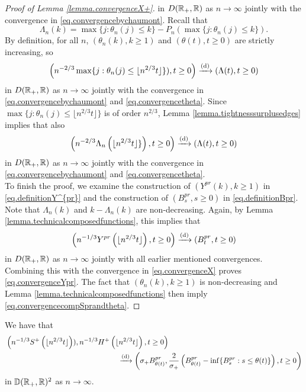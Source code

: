 \begin{proof}[Proof of Lemma \ref{lemma.convergenceX+}]
  in $D({\mathbb R}_+,{\mathbb R})$ as $n\to \infty$ jointly with the convergence in \eqref{eq.convergencebychaumont}.
Recall that 
$$\Lambda_n(k)=\max\{j:\theta_n(j)\leq k\}-P_n(\max\{j:\theta_n(j)\leq k\}). $$ By definition, for all $n$, $(\theta_n(k),k\geq 1)$ and $(\theta(t),t\geq 0)$ are strictly increasing, so
$$\left(n^{-2/3}\max\{j:\theta_n(j)\leq \lfloor n^{2/3} t \rfloor\} ),t\geq 0\right)\xrightarrow[]{\mathrm{(d)}}\left( \Lambda(t),t\geq0 \right)$$
in $D({\mathbb R}_+,{\mathbb R})$ as $n\to \infty$ jointly with the convergence in \eqref{eq.convergencebychaumont} and \eqref{eq.convergencetheta}. Since $\max\{j:\theta_n(j)\leq \lfloor n^{2/3} t \rfloor\}$ is of order $n^{2/3}$, Lemma \ref{lemma.tightnesssurplusedges} implies that also 
$$\left(n^{-2/3}\Lambda_n\left(\lfloor n^{2/3} t \rfloor\} \right),t\geq 0\right)\xrightarrow[]{\mathrm{(d)}}\left( \Lambda(t),t\geq0 \right)$$
in $D({\mathbb R}_+,{\mathbb R})$ as $n\to \infty$ jointly with the convergence in \eqref{eq.convergencebychaumont} and \eqref{eq.convergencetheta}.\\
To finish the proof, we examine the construction of $(Y^{pr}(k),k\geq 1)$ in \eqref{eq.definitionY^{pr}} and the construction of $(B^{pr}_s,s\geq 0)$ in \eqref{eq.definitionBpr}. 
Note that $\Lambda_n(k)$ and $k-\Lambda_n(k)$ are non-decreasing. Again, by Lemma \ref{lemma.technicalcomposedfunctions}, this implies that 
$$\left(n^{-1/3}Y^{pr}\left( \lfloor n^{2/3} t \rfloor \right), t\geq 0 \right)\xrightarrow[]{\mathrm{(d)}} \left( B^{pr}_{t}, t\geq 0\right)$$
in $D({\mathbb R}_+,{\mathbb R})$ as $n\to \infty$ jointly with all earlier mentioned convergences. Combining this with the convergence in \eqref{eq.convergenceX} proves \eqref{eq.convergenceYpr}. The fact that $(\theta_n(k),k\geq 1)$ is non-decreasing and Lemma \ref{lemma.technicalcomposedfunctions} then imply \eqref{eq.convergencecompSprandtheta}. 
\end{proof}

\begin{lemma}\label{lemma.subtracterrorconverges}
We have that 
\begin{align*}
& \left(n^{-1/3}S^{+}\left(\lfloor n^{2/3}t\rfloor \right)), n^{-1/3}H^{+}\left(\lfloor n^{2/3}t\rfloor \right) ,t\geq 0 \right) \\
& \hspace{15em} \todist \left(\sigma_+ B^{pr}_{\theta (t)},\frac{2}{\sigma_+} \left(B^{pr}_{\theta (t)}-\inf\{B^{pr}_{s}:s\leq \theta(t)\}\right) ,t\geq 0 \right)
\end{align*}
in ${\mathbb D}({\mathbb R}_+,{\mathbb R})^2$ as $n\to \infty$. 
\end{lemma}


